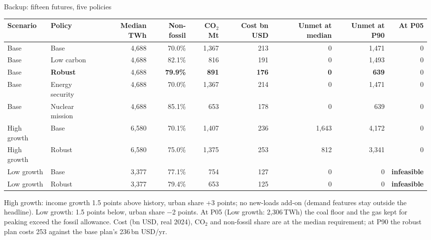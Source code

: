 \documentclass[aspectratio=169,10pt,t]{beamer}
\newcommand{\down}[1]{\textcolor{signal}{\bfseries #1}}
\begin{document}
\begin{frame}[label=b3]{Backup: fifteen futures, five policies}
{\fontsize{7.0}{8.6}\selectfont
\renewcommand{\arraystretch}{1.08}
\setlength{\tabcolsep}{4pt}
\begin{tabular}{@{}llrrrrrrr@{}}
\toprule
Scenario & Policy & Median TWh & Non-fossil & CO$_2$ Mt & Cost bn USD & Unmet at median & Unmet at P90 & At P05\\
\midrule
Base & Base & 4,688 & 70.0\% & 1,367 & 213 & 0 & 1,471 & 0\\
Base & Low carbon & 4,688 & 82.1\% & 816 & 191 & 0 & 1,493 & 0\\
Base & \textbf{Robust} & 4,688 & \textbf{79.9\%} & \textbf{891} & \textbf{176} & \textbf{0} & \textbf{639} & 0\\
Base & Energy security & 4,688 & 70.0\% & 1,367 & 214 & 0 & 1,471 & 0\\
Base & Nuclear mission & 4,688 & 85.1\% & 653 & 178 & 0 & 639 & 0\\
High growth & Base & 6,580 & 70.1\% & 1,407 & 236 & 1,643 & 4,172 & 0\\
High growth & Robust & 6,580 & 75.0\% & 1,375 & 253 & 812 & 3,341 & 0\\
Low growth & Base & 3,377 & 77.1\% & 754 & 127 & 0 & 0 & \down{infeasible}\\
Low growth & Robust & 3,377 & 79.4\% & 653 & 125 & 0 & 0 & \down{infeasible}\\
\bottomrule
\end{tabular}}
\vspace{2mm}
{\fontsize{8}{9.8}\selectfont\color{ink2}High growth: income growth 1.5 points above history, urban share +3 points; no new-loads add-on (demand features stay outside the headline). Low growth: 1.5 points below, urban share $-$2 points. At P05 (Low growth: 2,306\,TWh) the coal floor and the gas kept for peaking exceed the fossil allowance. Cost (bn USD, real 2024), CO$_2$ and non-fossil share are at the median requirement; at P90 the robust plan costs 253 against the base plan's 236\,bn USD/yr.\par}
\end{frame}
\end{document}
